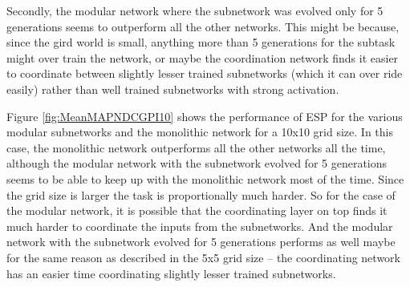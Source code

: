 Secondly, the modular network where the subnetwork was evolved only for 5 generations seems to outperform all the other networks. This might be because, since the gird world is small, anything more than 5 generations for the subtask might over train the network, or maybe the coordination network finds it easier to coordinate between slightly lesser trained subnetworks (which it can over ride easily) rather than well trained subnetworks with strong activation.

Figure \ref{fig:MeanMAPNDCGPI10} shows the performance of ESP for the various modular subnetworks and the monolithic network for a 10x10 grid size. In this case, the monolithic network outperforms all the other networks all the time, although the modular network with the subnetwork evolved for 5 generations seems to be able to keep up with the monolithic network most of the time. Since the grid size is larger the task is proportionally much harder. So for the case of the modular network, it is possible that the coordinating layer on top finds it much harder to coordinate the inputs from the subnetworks. And the modular network with the subnetwork evolved for 5 generations performs as well maybe for the same reason as described in the 5x5 grid size -- the coordinating network has an easier time coordinating slightly lesser trained subnetworks.





